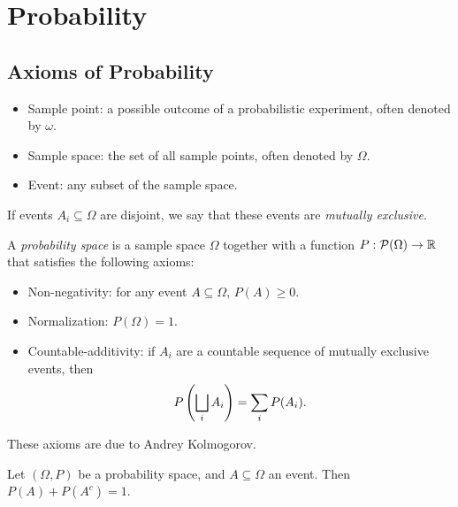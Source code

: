 \chapter{Probability}
\label{ch:probability}

\section{Axioms of Probability}

\begin{defn}\proofbreak
    \begin{itemize}
        \item Sample point: a possible outcome of a probabilistic experiment, often denoted by $\omega$.
        \item Sample space: the set of all sample points, often denoted by $\Omega$.
        \item Event: any subset of the sample space.
    \end{itemize}
\end{defn}

\begin{defn}
    If events $A_i \subseteq \Omega$ are disjoint, we say that these events are \emph{mutually exclusive}.
\end{defn}

\begin{defn}\label{kolmogorov-probability-axioms}
    A \emph{probability space} is a sample space $\Omega$ together with a function $P: \mathcal{P}(\Omega) \to \mathbb{R}$ that satisfies the following axioms:
    \begin{itemize}
        \item Non-negativity: for any event $A \subseteq \Omega$, $P(A) \geq 0$.
        \item Normalization: $P(\Omega) = 1$.
        \item Countable-additivity: if $A_i$ are a countable sequence of mutually exclusive events, then \[P\left(\bigsqcup_{i}A_i\right) = \sum_{i}P(A_i).\]
    \end{itemize}
\end{defn}

\begin{rmk}
    These axioms are due to Andrey Kolmogorov.
\end{rmk}

\begin{prop}
    Let $(\Omega, P)$ be a probability space, and $A \subseteq \Omega$ an event. Then $P(A) + P(A^{c}) = 1$.
\end{prop}


